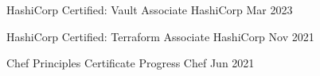 \textcolor{awesome}{\raisebox{0.1\height}{\faCertificate\thinspace}}


\begin{cvhonors}

  \cvhonor
    {HashiCorp Certified: Vault Associate} %
    {HashiCorp} %
    {} %
    {Mar 2023} %

  \cvhonor
    {HashiCorp Certified: Terraform Associate} %
    {HashiCorp} %
    {} %
    {Nov 2021} %

  \cvhonor
    {Chef Principles Certificate} %
    {Progress Chef} %
    {} %
    {Jun 2021} %

\end{cvhonors}
